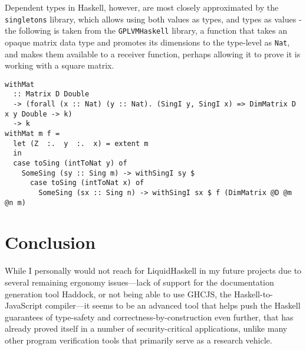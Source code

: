 \documentclass[11pt]{article}
\begin{document}
Dependent types in Haskell, however, are most closely approximated by the
\texttt{singletons} library, which allows using both values as types, and types as
values - the following is taken from the \texttt{GPLVMHaskell} library, a function that
takes an opaque matrix data type and promotes its dimensions to the type-level
as \texttt{Nat}, and makes them available to a receiver function, perhaps allowing it to
prove it is working with a square matrix.

\begin{verbatim}
withMat
  :: Matrix D Double
  -> (forall (x :: Nat) (y :: Nat). (SingI y, SingI x) => DimMatrix D x y Double -> k)
  -> k
withMat m f =
  let (Z  :.  y  :.  x) = extent m
  in
  case toSing (intToNat y) of
    SomeSing (sy :: Sing m) -> withSingI sy $
      case toSing (intToNat x) of
        SomeSing (sx :: Sing n) -> withSingI sx $ f (DimMatrix @D @m @n m)
\end{verbatim}

\section{Conclusion}
\label{sec:org9e55f7e}
While I personally would not reach for LiquidHaskell in my future projects due
to several remaining ergonomy issues---lack of support for the documentation
generation tool Haddock, or not being able to use GHCJS, the
Haskell-to-JavaScript compiler---it seems to be an advanced tool that helps push
the Haskell guarantees of type-safety and correctness-by-construction even
further, that has already proved itself in a number of security-critical
applications, unlike many other program verification tools that primarily serve
as a research vehicle.
\end{document}
